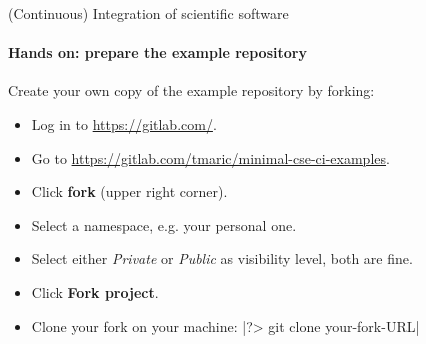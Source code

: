 \begin{frame}{(Continuous) Integration of scientific software}
    \framesubtitle{Hands on: prepare the example repository}
    Create your own copy of the example repository by forking:
    \begin{itemize}
        \item Log in to \href{https://gitlab.com/}{https://gitlab.com/}.
        \item Go to \href{https://gitlab.com/tmaric/minimal-cse-ci-examples}{https://gitlab.com/tmaric/minimal-cse-ci-examples}.
        \item Click \textbf{fork} (upper right corner).
        \item Select a namespace, e.g. your personal one.
        \item Select either \emph{Private} or \emph{Public} as visibility level, both are fine.
        \item Click \textbf{Fork project}.
        \item Clone your fork on your machine: |?> git clone your-fork-URL|
    \end{itemize}
\end{frame}
